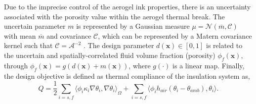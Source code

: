 \documentclass[pdf-a,balance,colorlinks,upint,subscriptcorrection,varvw,mathalfa=cal=boondoxo, spanish,french,vietnamese,russian,greek]{asmeconf}
\begin{document}
Due to the imprecise control of the aerogel ink properties, there is an uncertainty associated with the porosity value within the aerogel thermal break.
The uncertain parameter $m$ is represented by a Gaussian measure $\mu = \mathcal{N}(\overline{m},\mathcal{C})$ with mean $\overline{m}$ and covariance $\mathcal{C}$, which can be represented by a Matern covariance kernel such that $\mathcal{C} = \mathcal{A}^{-2}$ \cite{lindgren2011explicit}. 
The design parameter $d(\boldsymbol{x}) \in [0, 1]$ is related to the uncertain and spatially-correlated fluid volume fraction (porosity) $\phi_f(\boldsymbol{x})$, through $\phi_f(\boldsymbol{x}) = g(d(\boldsymbol{x}) + m(\boldsymbol{x}))$, where $g(\cdot)$ is a linear map.
Finally, the design objective is defined as thermal compliance of the insulation system as, 
\begin{equation}
    Q = \frac{1}{2} \sum_{i=s,f} {\langle \phi_i \kappa_i \nabla \theta_i,  \nabla \theta_i \rangle}_{\Omega}  + \sum_{i=s,f}  {\langle \phi_i h_{air} (\theta_i - \theta_{amb}), \theta_i \rangle }.
\end{equation}


\end{document}
